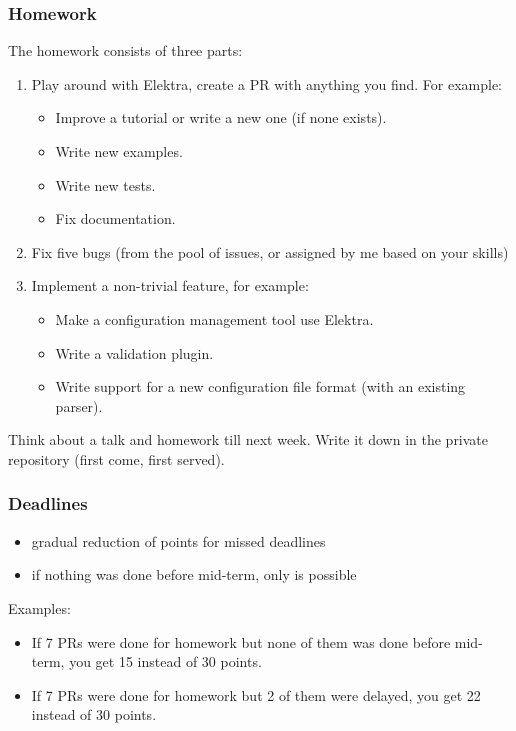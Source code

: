 \begin{frame}
	\frametitle{Homework}
	The homework consists of three parts:
	\begin{enumerate}
		\item Play around with Elektra, create a PR with anything you find.
		For example:
		\begin{itemize}
			\item Improve a tutorial or write a new one (if none exists).
			\item Write new examples.
			\item Write new tests.
			\item Fix documentation.
		\end{itemize}
		\item Fix five bugs (from the pool of issues, or assigned by me based on your skills)
		\item Implement a non-trivial feature, for example:
		\begin{itemize}
			\item Make a configuration management tool use Elektra.
			\item Write a validation plugin.
			\item Write support for a new configuration file format (with an existing parser).
		\end{itemize}
	\end{enumerate}
\end{frame}

\begin{assignment}
	\begin{task}
	Think about a talk and homework till next week.
	Write it down in the private repository (first come, first served).
	\end{task}
\end{assignment}

\begin{frame}
	\frametitle{Deadlines}

	\begin{itemize}
	\item gradual reduction of points for missed deadlines
	\item if nothing was done before mid-term, only  is possible
	\end{itemize}
	Examples:

	\begin{itemize}
	\item If 7 PRs were done for homework but none of them was done before mid-term, you get 15 instead of 30 points.
	\item If 7 PRs were done for homework but 2 of them were delayed, you get 22 instead of 30 points.
	\end{itemize}
\end{frame}

